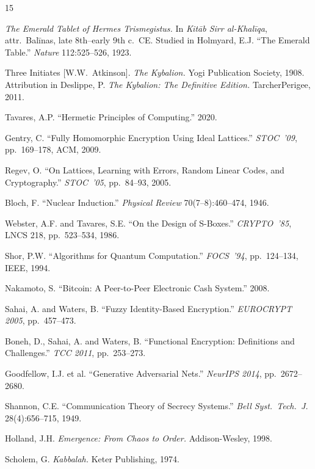\documentclass[sigplan,anonymous=false]{acmart}
\begin{document}
\begin{thebibliography}{15}

\emph{The Emerald Tablet of Hermes Trismegistus.} In \emph{Kit\=ab Sirr al-Khal\=iqa}, attr.\ Bal\=inas, late 8th--early 9th c.\ CE. Studied in Holmyard, E.J. ``The Emerald Table.'' \emph{Nature} 112:525--526, 1923.

Three Initiates [W.W.\ Atkinson]. \emph{The Kybalion.} Yogi Publication Society, 1908. Attribution in Deslippe, P. \emph{The Kybalion: The Definitive Edition.} TarcherPerigee, 2011.

Tavares, A.P. ``Hermetic Principles of Computing.'' 2020.

Gentry, C. ``Fully Homomorphic Encryption Using Ideal Lattices.'' \emph{STOC~'09}, pp.~169--178, ACM, 2009.

Regev, O. ``On Lattices, Learning with Errors, Random Linear Codes, and Cryptography.'' \emph{STOC~'05}, pp.~84--93, 2005.

Bloch, F. ``Nuclear Induction.'' \emph{Physical Review} 70(7--8):460--474, 1946.

Webster, A.F. and Tavares, S.E. ``On the Design of S-Boxes.'' \emph{CRYPTO~'85}, LNCS 218, pp.~523--534, 1986.

Shor, P.W. ``Algorithms for Quantum Computation.'' \emph{FOCS~'94}, pp.~124--134, IEEE, 1994.

Nakamoto, S. ``Bitcoin: A Peer-to-Peer Electronic Cash System.'' 2008.

Sahai, A. and Waters, B. ``Fuzzy Identity-Based Encryption.'' \emph{EUROCRYPT 2005}, pp.~457--473.

Boneh, D., Sahai, A. and Waters, B. ``Functional Encryption: Definitions and Challenges.'' \emph{TCC 2011}, pp.~253--273.

Goodfellow, I.J. et al. ``Generative Adversarial Nets.'' \emph{NeurIPS 2014}, pp.~2672--2680.

Shannon, C.E. ``Communication Theory of Secrecy Systems.'' \emph{Bell Syst.\ Tech.\ J.} 28(4):656--715, 1949.

Holland, J.H. \emph{Emergence: From Chaos to Order.} Addison-Wesley, 1998.

Scholem, G. \emph{Kabbalah.} Keter Publishing, 1974.

\end{thebibliography}
\end{document}
